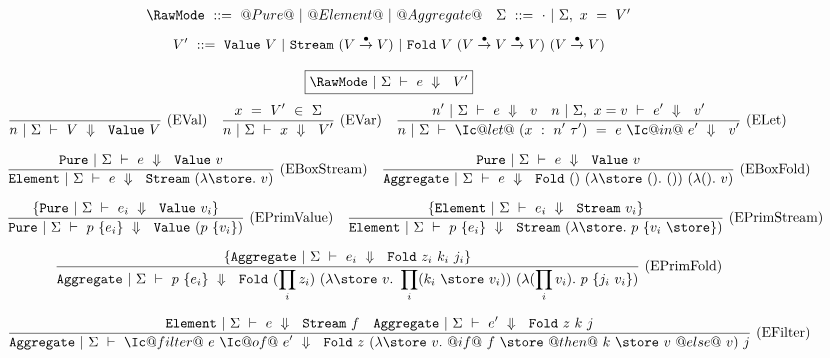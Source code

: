 
\begin{figure*}
$$
\begin{array}{ll}

\RawMode~::=~@Pure@~|~@Element@~|~@Aggregate@

&

\Sigma~::=~\cdot~|~\Sigma,~x~=~V'

\end{array}
$$
$$
V'~     ::=~\VValue{V}
        ~|~\VStream {(V \stackrel{\bullet}{\to} V)}
        ~|~\VFold{V}{(V \stackrel{\bullet}{\to} V \stackrel{\bullet}{\to} V)}
                    {(V \stackrel{\bullet}{\to} V)}
$$

  \footnotesize


$$
\boxed{\SourceStepX{\RawMode}{\Sigma}{e}{V'}}
$$
$$
\ruleAx
{
    \SourceStepX{n}{\Sigma}{V}{\VValue{V}}
}{EVal}
\ruleIN
{
    x~=~V'~\in~\Sigma
}
{
    \SourceStepX{n}{\Sigma}{x}{V'}
}{EVar}
\ruleIN
{
  \SourceStepX{n'}{\Sigma}{e}{v}
  \quad
  \SourceStepX{n}{\Sigma,~x=v}{e'}{v'}
}
{
  \SourceStepX
    {n}
    {\Sigma}
    {\Ic@let@~(x~:~n'~\tau')~=~e~\Ic@in@~e'}
    {v'}
}{ELet}
$$

$$
\ruleIN
{
    \SourceStepXP{\Sigma}{e}{\VValue{v}}
}
{
    \SourceStepXE{\Sigma}{e}{\VStream{(\lam{\store} v)}}
}{EBoxStream}
\ruleIN
{
    \SourceStepXP{\Sigma}{e}{\VValue{v}}
}
{
    \SourceStepXA{\Sigma}{e}{\VFold{()}{(\lam{\store~()} ())}{(\lam{()} v)}}
}{EBoxFold}
$$

$$
\ruleIN
{
  \{ \SourceStepXP{\Sigma}{e_i}{\VValue{v_i}} \}
}
{
  \SourceStepXP
    {\Sigma}
    {p~\{ e_i \} }
    {\VValue{(p~\{v_i\})}}
}{EPrimValue}
\ruleIN
{
  \{ \SourceStepXE{\Sigma}{e_i}{\VStream{v_i}} \}
}
{
  \SourceStepXE
    {\Sigma}
    {p~\{ e_i \} }
    {\VStream{(\lam{\store} p~\{v_i~\store\})}}
}{EPrimStream}
$$

$$
\ruleIN
{
  \{ \SourceStepXA{\Sigma}{e_i}{\VFold{z_i}{k_i}{j_i}} \}
}
{
  \SourceStepXA{\Sigma}
    {p~\{ e_i \} }
    { \VFold
      {(\prod_i z_i)}
      {(\lam{\store~v}
        \prod_i (k_i~\store~v_i))}
      {(\lam{(\prod_i v_i)}
        p~\{j_i~v_i\})}}
}{EPrimFold}
$$

$$
\ruleIN
{
  \SourceStepXE{\Sigma}{e}{\VStream{f}}
  \quad
  \SourceStepXA{\Sigma}{e'}{\VFold{z}{k}{j}}
}
{
  \SourceStepXA{\Sigma}
    {\Ic@filter@~e~\Ic@of@~e'}
    {\VFold
      {z}
      {(\lam{\store~v}
         @if@~f~\store~@then@~k~\store~v~@else@~v)}
      {j}}
}{EFilter}
$$


\end{figure*}
